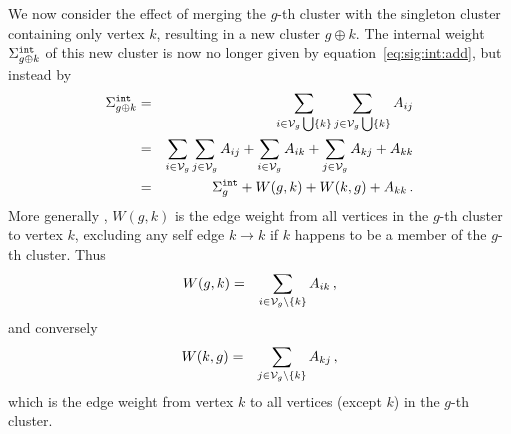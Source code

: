 \documentclass[a4paper]{article}
\begin{document}
We now consider the effect of merging the $g$-th cluster with the singleton cluster containing only vertex $k$, resulting
in a new cluster $g\oplus k$.
The internal weight $\Sigma^{\tt int}_{g\oplus k}$ of this new cluster is now
no longer given by equation~\eqref{eq:sig:int:add}, but instead by
\begin{eqnarray}
   \Sigma_{g\oplus k}^{\tt int} & = & \sum_{i\in{\cal V}_g\bigcup\{k\}}
   \sum_{j\in{\cal V}_g\bigcup\{k\}} A_{ij}
\nonumber\\&=&
    \sum_{i\in{\cal V}_g}\sum_{j\in{\cal V}_g} A_{ij}
    +\sum_{i\in{\cal V}_g}A_{ik}+\sum_{j\in{\cal V}_g}A_{kj}+A_{kk}
\nonumber\\&=&
    \Sigma_g^{\tt int}+W(g,k)+W(k,g)+A_{kk}\,.
\end{eqnarray}
More generally \cite{browet14}, $W(g,k)$ is the edge weight from all vertices in the $g$-th cluster to vertex $k$, excluding any self edge
$k\rightarrow k$ if $k$ happens to be a member of the $g$-th cluster.  Thus
\begin{eqnarray}
  W(g,k) & = & \sum_{i\in{\cal V}_g\backslash\{k\}}A_{ik}\,,
\label{eq:W:g:k}
\end{eqnarray}
and conversely
\begin{eqnarray}
  W(k,g) & = & \sum_{j\in{\cal V}_g\backslash\{k\}}A_{kj}\,,
\label{eq:W:k:g}
\end{eqnarray}
which is the edge weight from vertex $k$ to all vertices (except $k$) in the $g$-th cluster.
\end{document}
